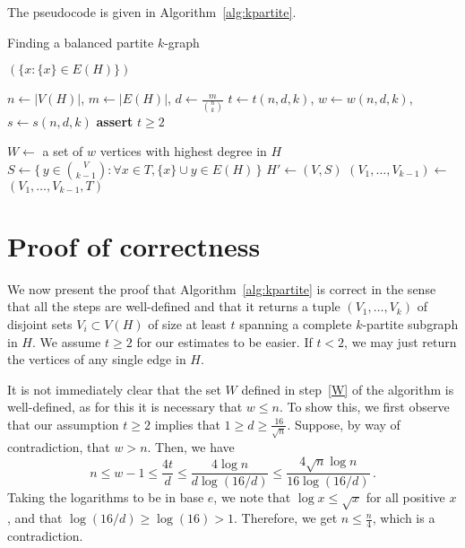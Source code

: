 The pseudocode is given in Algorithm~\ref{alg:kpartite}.

\begin{algorithm}[H]
    \caption{Finding a balanced partite $k$-graph}
    \label{alg:kpartite}
    \begin{algorithmic}[1]
                \State \Return $(\{x \colon \{x\} \in E(H)\})$
            \EndIf

            \State $n \gets |V(H)|$, $m \gets |E(H)|$, $d \gets \frac{m}{\binom{n}{k}}$
            \State $t \gets t(n, d, k)$, $w \gets w(n, d, k)$, $s \gets s(n, d, k)$
            \State \textbf{assert} $t \ge 2$

            \State $W \gets$ a set of $w$ vertices with highest degree in $H$
                \State $S \gets \{\,y \in \binom{V}{k-1} \colon \forall x \in T, \{x\} \cup y \in E(H)\,\}$
                    \State $H' \gets (V, S)$  
                    \State $(V_1, \dots, V_{k-1}) \gets$  \label{recurse}
                    \State \Return $(V_1, \dots, V_{k-1}, T)$
                \EndIf
            \EndFor
        \EndFunction
    \end{algorithmic}
\end{algorithm}

\section{Proof of correctness}\label{sec:correctness}

We now present the proof that Algorithm~\ref{alg:kpartite} is correct in the sense that
all the steps are well-defined and that it returns a tuple $(V_1, \dots, V_k)$ of disjoint sets $V_i \subset V(H)$
of size at least $t$ spanning a complete $k$-partite subgraph in $H$.
We assume $t \ge 2$ for our estimates to be easier.
If $t < 2$, we may just return the vertices of any single edge in $H$.

It is not immediately clear that the set $W$ defined in step~\ref{W} of the algorithm
is well-defined, as for this it is necessary that $w \leq n$.
To show this, we first observe that our assumption $t \geq 2$
implies that $ 1 \geq d \geq \frac{16}{\sqrt {n}}$.
Suppose, by way of contradiction, that $w > n$.
Then, we have
\[
    n \leq w - 1 \leq \frac{4t}{d} \leq \frac{4\log n}{d\log(16/d)} \leq \frac{4 \sqrt {n} \log n }{16 \log(16/d)}\,.
\]
Taking the logarithms to be in base $e$, we note that $\log x \leq \sqrt {x}$ for all positive $x$,
and that $\log(16/d) \geq \log(16) > 1$.
Therefore, we get $n \leq \frac{n}{4}$, which is a contradiction.

